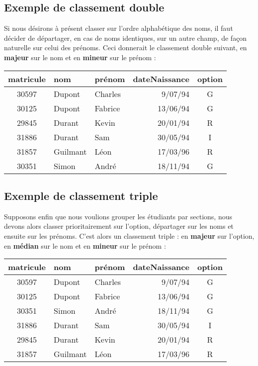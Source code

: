 \subsection*{Exemple de classement double}

	Si nous désirons à présent classer sur l’ordre alphabétique des noms, il
	faut décider de départager, en cas de noms identiques, sur un autre
	champ, de façon naturelle sur celui des prénoms. Ceci donnerait le
	classement double suivant, en \textbf{majeur} sur le nom et en
	\textbf{mineur} sur le prénom :
	
	\begin{center}
	\small\sffamily
	\begin{tabular}{cllrc}
		matricule 	& nom 		& prénom 	& dateNaissance & option \\
		\hline 
		30597 		& Dupont 	& Charles 	& 9/07/94 		& G\\
		30125 		& Dupont	& Fabrice 	& 13/06/94 		& G\\
		29845     	& Durant 	& Kevin 	& 20/01/94 		& R\\
		31886 		& Durant  	& Sam 		& 30/05/94 		& I\\
		31857 		& Guilmant  & Léon 		& 17/03/96 		& R\\
		30351 		& Simon 	& André 	& 18/11/94 		& G\\
		\hline 
	\end{tabular}
	\end{center}
	
\subsection*{Exemple de classement triple}

	Supposons enfin que nous voulions grouper les étudiants par sections,
	nous devons alors classer prioritairement sur l’option, départager sur
	les noms et ensuite sur les prénoms. C’est alors un classement triple :
	en \textbf{majeur} sur l’option, en \textbf{médian} sur le nom et en
	\textbf{mineur} sur le prénom : 

	\begin{center}
	\small\sffamily
	\begin{tabular}{cllrc}
		matricule 	& nom 		& prénom 	& dateNaissance & option \\
		\hline 
		30597 		& Dupont 	& Charles 	& 9/07/94 		& G\\
		30125 		& Dupont	& Fabrice 	& 13/06/94 		& G\\
		30351 		& Simon 	& André 	& 18/11/94 		& G\\
		31886 		& Durant  	& Sam 		& 30/05/94 		& I\\
		29845     	& Durant 	& Kevin 	& 20/01/94 		& R\\
		31857 		& Guilmant  & Léon 		& 17/03/96 		& R\\
		\hline 
	\end{tabular}
	\end{center}


